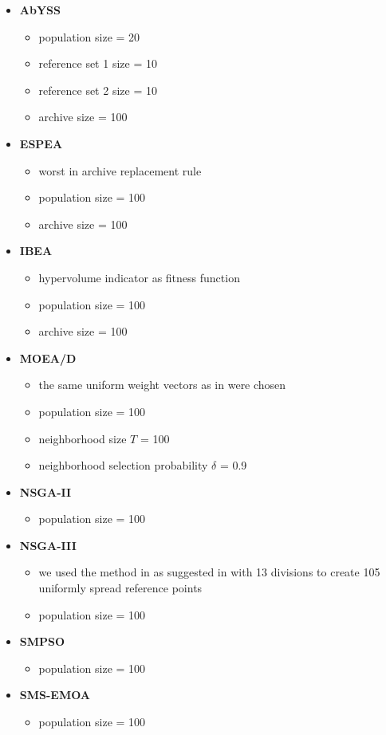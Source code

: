 \begin{itemize}
	\item \textbf{AbYSS}
	\begin{itemize}
		\item population size = 20
		\item reference set 1 size = 10
		\item reference set 2 size = 10
		\item archive size = 100
	\end{itemize}
	\item \textbf{ESPEA}
	\begin{itemize}
		\item worst in archive replacement rule
		\item population size = 100
		\item archive size = 100
	\end{itemize}
	\item \textbf{IBEA}
	\begin{itemize}
		\item hypervolume indicator as fitness function
		\item population size = 100
		\item archive size = 100
	\end{itemize}
	\item \textbf{MOEA/D}
	\begin{itemize}
	  \item the same uniform weight vectors as in \cite{moead2009} were chosen
		\item population size = 100
		\item neighborhood size $T$ = 100
		\item neighborhood selection probability $\delta$ = 0.9
	\end{itemize}
	\item \textbf{NSGA-II}
	\begin{itemize}
		\item population size = 100
	\end{itemize}
	\item \textbf{ NSGA-III}
	\begin{itemize}
		\item we used the method in \cite{nbi} as suggested in \cite{nsga3part1} with 13 divisions to create 105 uniformly spread reference points
		\item population size = 100
	\end{itemize}
	\item \textbf{SMPSO}
	\begin{itemize}
		\item population size = 100
	\end{itemize}
	\item \textbf{SMS-EMOA}
	\begin{itemize}
		\item population size = 100
	\end{itemize}
\end{itemize}

